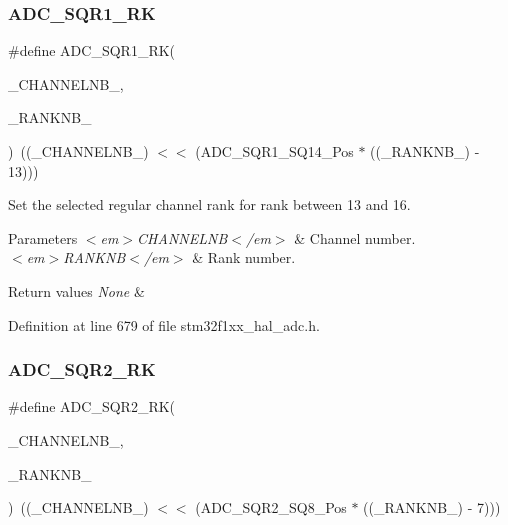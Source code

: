 \subsubsection{\texorpdfstring{A\+D\+C\+\_\+\+S\+Q\+R1\+\_\+\+RK}{ADC\_SQR1\_RK}}
{\footnotesize\ttfamily \#define A\+D\+C\+\_\+\+S\+Q\+R1\+\_\+\+RK(\begin{DoxyParamCaption}\item[{}]{\+\_\+\+C\+H\+A\+N\+N\+E\+L\+N\+B\+\_\+,  }\item[{}]{\+\_\+\+R\+A\+N\+K\+N\+B\+\_\+ }\end{DoxyParamCaption})~((\+\_\+\+C\+H\+A\+N\+N\+E\+L\+N\+B\+\_\+) $<$$<$ (A\+D\+C\+\_\+\+S\+Q\+R1\+\_\+\+S\+Q14\+\_\+\+Pos $\ast$ ((\+\_\+\+R\+A\+N\+K\+N\+B\+\_\+) -\/ 13)))}



Set the selected regular channel rank for rank between 13 and 16. 


\begin{DoxyParams}{Parameters}
{\em $<$em$>$\+C\+H\+A\+N\+N\+E\+L\+N\+B$<$/em$>$} & Channel number. \\
\hline
{\em $<$em$>$\+R\+A\+N\+K\+N\+B$<$/em$>$} & Rank number. \\
\hline
\end{DoxyParams}

\begin{DoxyRetVals}{Return values}
{\em None} & \\
\hline
\end{DoxyRetVals}


Definition at line 679 of file stm32f1xx\+\_\+hal\+\_\+adc.\+h.

\mbox{\label{group___a_d_c___private___macros_gad07a38a5b6d28f23ecbe027222f59bd0}} 
\subsubsection{\texorpdfstring{A\+D\+C\+\_\+\+S\+Q\+R2\+\_\+\+RK}{ADC\_SQR2\_RK}}
{\footnotesize\ttfamily \#define A\+D\+C\+\_\+\+S\+Q\+R2\+\_\+\+RK(\begin{DoxyParamCaption}\item[{}]{\+\_\+\+C\+H\+A\+N\+N\+E\+L\+N\+B\+\_\+,  }\item[{}]{\+\_\+\+R\+A\+N\+K\+N\+B\+\_\+ }\end{DoxyParamCaption})~((\+\_\+\+C\+H\+A\+N\+N\+E\+L\+N\+B\+\_\+) $<$$<$ (A\+D\+C\+\_\+\+S\+Q\+R2\+\_\+\+S\+Q8\+\_\+\+Pos $\ast$ ((\+\_\+\+R\+A\+N\+K\+N\+B\+\_\+) -\/ 7)))}



